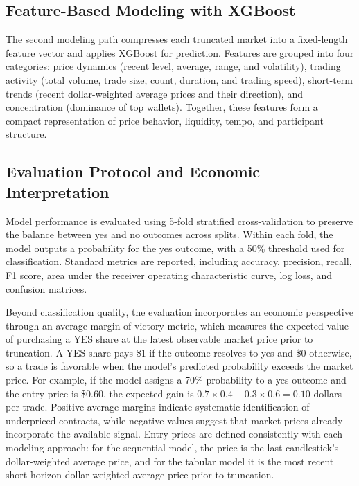 \documentclass[11pt]{article}
\begin{document}
\subsection{Feature-Based Modeling with XGBoost}

The second modeling path compresses each truncated market into a fixed-length feature vector and applies XGBoost for prediction. Features are grouped into four categories: price dynamics (recent level, average, range, and volatility), trading activity (total volume, trade size, count, duration, and trading speed), short-term trends (recent dollar-weighted average prices and their direction), and concentration (dominance of top wallets). Together, these features form a compact representation of price behavior, liquidity, tempo, and participant structure.

\subsection{Evaluation Protocol and Economic Interpretation}

Model performance is evaluated using 5-fold stratified cross-validation to preserve the balance between yes and no outcomes across splits. Within each fold, the model outputs a probability for the yes outcome, with a 50\% threshold used for classification. Standard metrics are reported, including accuracy, precision, recall, F1 score, area under the receiver operating characteristic curve, log loss, and confusion matrices.

Beyond classification quality, the evaluation incorporates an economic perspective through an average margin of victory metric, which measures the expected value of purchasing a YES share at the latest observable market price prior to truncation. A YES share pays \$1 if the outcome resolves to yes and \$0 otherwise, so a trade is favorable when the model's predicted probability exceeds the market price. For example, if the model assigns a 70\% probability to a yes outcome and the entry price is \$0.60, the expected gain is \(0.7 \times 0.4 - 0.3 \times 0.6 = 0.10\) dollars per trade. Positive average margins indicate systematic identification of underpriced contracts, while negative values suggest that market prices already incorporate the available signal. Entry prices are defined consistently with each modeling approach: for the sequential model, the price is the last candlestick's dollar-weighted average price, and for the tabular model it is the most recent short-horizon dollar-weighted average price prior to truncation.
\end{document}
